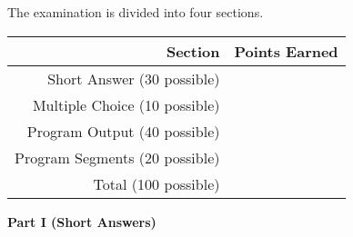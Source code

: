 \documentclass[12pt]{article}
\begin{document}
\begin{center}
  The examination is divided into four sections. \\
  \vspace*{.3in}

  \begin{tabular}{|r | l|} \hline
    {\bf Section} & {\bf Points Earned} \\ \hline 
    {Short Answer (30 possible)} & \hspace*{1.5in} \\ 
    {Multiple Choice (10 possible)} & \hspace*{1.5in} \\    
    {Program Output  (40 possible)} & \hspace*{1.5in} \\    
    {Program Segments (20 possible)} & \hspace*{1.5in} \\ \hline
    {Total (100 possible)} & \hspace*{1.5in} \\ \hline
  \end{tabular}
\end{center}

\newpage

\noindent
{\bf Part I (Short Answers)}
\end{document}
